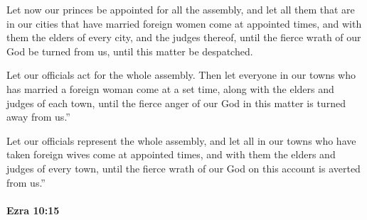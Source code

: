 			\begin{versebox}
					\item[BHS] 
					\item[LXX] 
					\item[ASV] Let now our princes be appointed for all the assembly, and let all them that are in our cities that have married foreign women come at appointed times, and with them the elders of every city, and the judges thereof, until the fierce wrath of our God be turned from us, until this matter be despatched.
					\item[NIV] Let our officials act for the whole assembly. Then let everyone in our towns who has married a foreign woman come at a set time, along with the elders and judges of each town, until the fierce anger of our God in this matter is turned away from us.”
					\item[NRSV] Let our officials represent the whole assembly, and let all in our towns who have taken foreign wives come at appointed times, and with them the elders and judges of every town, until the fierce wrath of our God on this account is averted from us.”
			\end{versebox}

		\paragraph{Ezra 10:15} %
			\label{EZRA-10-15}

